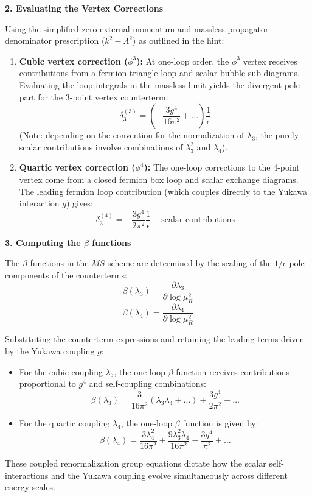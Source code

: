\textbf{2. Evaluating the Vertex Corrections}

Using the simplified zero-external-momentum and massless propagator denominator prescription ($k^2 - \Lambda^2$) as outlined in the hint:
\begin{enumerate}
    \item \textbf{Cubic vertex correction ($\phi^3$):}
          At one-loop order, the $\phi^3$ vertex receives contributions from a fermion triangle loop and scalar bubble sub-diagrams. Evaluating the loop integrals in the massless limit yields the divergent pole part for the 3-point vertex counterterm:
          \[
              \delta_3^{(3)} = \left( -\frac{3g^4}{16\pi^2} + \dots \right) \frac{1}{\epsilon}
          \]
          (Note: depending on the convention for the normalization of $\lambda_3$, the purely scalar contributions involve combinations of $\lambda_3^2$ and $\lambda_4$).

    \item \textbf{Quartic vertex correction ($\phi^4$):}
          The one-loop corrections to the 4-point vertex come from a closed fermion box loop and scalar exchange diagrams. The leading fermion loop contribution (which couples directly to the Yukawa interaction $g$) gives:
          \[
              \delta_3^{(4)} = -\frac{3g^4}{2\pi^2} \frac{1}{\epsilon} + \text{scalar contributions}
          \]
\end{enumerate}

\textbf{3. Computing the $\beta$ functions}

The $\beta$ functions in the $MS$ scheme are determined by the scaling of the $1/\epsilon$ pole components of the counterterms:
\[
    \beta(\lambda_3) = \frac{\partial \lambda_3}{\partial \log \mu_R^2}
\]
\[
    \beta(\lambda_4) = \frac{\partial \lambda_4}{\partial \log \mu_R^2}
\]

Substituting the counterterm expressions and retaining the leading terms driven by the Yukawa coupling $g$:
\begin{itemize}
    \item For the cubic coupling $\lambda_3$, the one-loop $\beta$ function receives contributions proportional to $g^4$ and self-coupling combinations:
          \[
              \beta(\lambda_3) = \frac{3}{16\pi^2} \left( \lambda_3 \lambda_4 + \dots \right) + \frac{3g^4}{2\pi^2} + \dots
          \]
    \item For the quartic coupling $\lambda_4$, the one-loop $\beta$ function is given by:
          \[
              \beta(\lambda_4) = \frac{3\lambda_4^2}{16\pi^2} + \frac{9\lambda_3^2 \lambda_4}{16\pi^2} - \frac{3g^4}{\pi^2} + \dots
          \]
\end{itemize}
These coupled renormalization group equations dictate how the scalar self-interactions and the Yukawa coupling evolve simultaneously across different energy scales.


